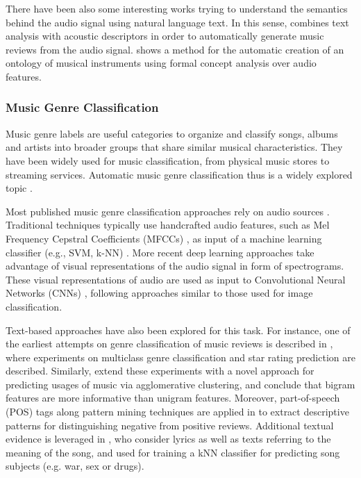 There have been also some interesting works trying to understand the semantics behind the audio signal using natural language text. In this sense, \cite{Whitman2004} combines text analysis with acoustic descriptors in order to automatically generate music reviews from the audio signal. \cite{Kolozali2013} shows a method for the automatic creation of an ontology of musical instruments using formal concept analysis over audio features. 


\subsubsection{Music Genre Classification}
\label{sec:SOA:mir:classfication}

Music genre labels are useful categories to organize and classify songs, albums and artists into broader groups that share similar musical characteristics. They have been widely used for music classification, from physical music stores to streaming services. Automatic music genre classification thus is a widely explored topic \citep{sturm2012survey}.

Most published music genre classification approaches rely on audio sources \citep{sturm2012survey,bogdanov2016cross}. 
Traditional techniques typically use handcrafted audio features, such as Mel Frequency Cepstral Coefficients (MFCCs) \citep{logan2000mel}, as input of a machine learning classifier (e.g., SVM, k-NN) \citep{Tzanetakis2002,seyerlehner2010using}.
More recent deep learning approaches take advantage of visual representations of the audio signal in form of spectrograms.
These visual representations of audio are used as input to Convolutional Neural Networks (CNNs) \citep{dieleman2011audio,dieleman2014end,pons2016experimenting,Choi2016,choi2016convolutional}, following approaches similar to those used for image classification.

Text-based approaches have also been explored for this task. For instance, one of the earliest attempts on genre classification of music reviews is described in \citep{Hu2005}, where experiments on multiclass genre classification and star rating prediction are described. Similarly, \citep{Hu2006} extend these experiments with a novel approach for predicting usages of music via agglomerative clustering, and conclude that bigram features are more informative than unigram features. 
Moreover, part-of-speech (POS) tags along pattern mining techniques are applied in \citep{Downie2006} to extract descriptive patterns for distinguishing negative from positive reviews. Additional textual evidence is leveraged in \citep{Choi2014}, who consider lyrics as well as texts referring to the meaning of the song, and used for training a kNN classifier for predicting song subjects (e.g. war, sex or drugs).


